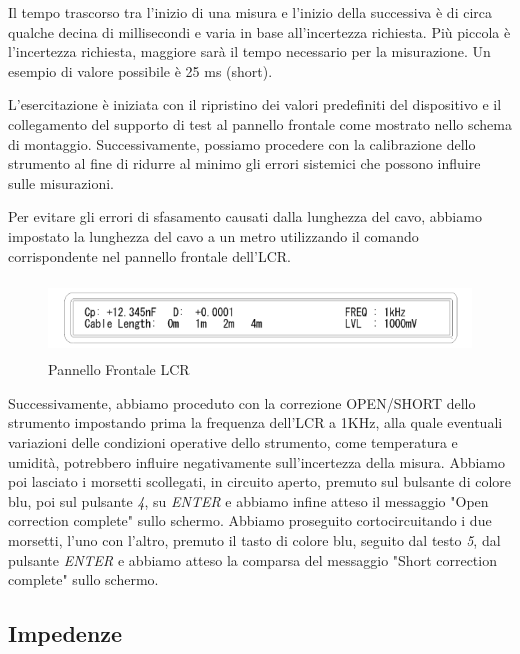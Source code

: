 Il tempo trascorso tra l'inizio di una misura e l'inizio della successiva è di circa qualche decina di millisecondi e varia in base all'incertezza richiesta. Più piccola è l'incertezza richiesta, maggiore sarà il tempo necessario per la misurazione. Un esempio di valore possibile è 25 ms (short).

L'esercitazione è iniziata con il ripristino dei valori predefiniti del dispositivo e il collegamento del supporto di test al pannello frontale come mostrato nello schema di montaggio. Successivamente, possiamo procedere con la calibrazione dello strumento al fine di ridurre al minimo gli errori sistemici che possono influire sulle misurazioni.

Per evitare gli errori di sfasamento causati dalla lunghezza del cavo, abbiamo impostato la lunghezza del cavo a un metro utilizzando il comando corrispondente nel pannello frontale dell'LCR.

\begin{figure}[ht]
    \centering
    \includegraphics[height=2cm]{media/pannello_frontale_LCR.png}
    \caption{Pannello Frontale LCR}
    \label{fig:pannello_frontale_LCR}
\end{figure}
\FloatBarrier

Successivamente, abbiamo proceduto con la correzione OPEN/SHORT dello strumento
impostando prima la frequenza dell'LCR a 1KHz, alla quale eventuali variazioni delle condizioni operative dello strumento, come temperatura e umidità, potrebbero influire negativamente sull'incertezza della misura. Abbiamo poi lasciato i morsetti scollegati, in circuito aperto, premuto sul bulsante di colore blu, poi sul pulsante \emph{4}, su \emph{ENTER} e abbiamo infine atteso il messaggio "Open correction complete" sullo schermo. Abbiamo proseguito cortocircuitando i due morsetti, l'uno con l'altro, premuto il tasto di colore blu, seguito dal testo \emph{5}, dal pulsante \emph{ENTER} e abbiamo atteso la comparsa del messaggio "Short correction complete" sullo schermo.
 



\subsection{Impedenze}
\label{sub:z}

